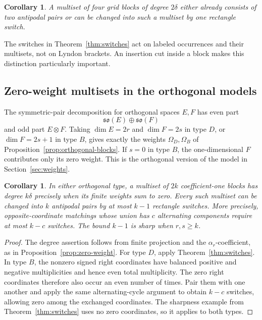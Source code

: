 \documentclass[11pt]{amsart}
\numberwithin{equation}{section}
\newtheorem{corollary}[theorem]{Corollary}
\theoremstyle{definition}
\begin{document}
\begin{corollary}\label{cor:four-weights}
A multiset of four grid blocks of degree $2\delta$ either already consists of two antipodal pairs or can be changed into such a multiset by one rectangle switch.
\end{corollary}

The switches in Theorem~\ref{thm:switches} act on labeled occurrences and their multisets, not on Lyndon brackets. An insertion cut inside a block makes this distinction particularly important.


\subsection{Zero-weight multisets in the orthogonal models}\label{subsec:orthogonal-switches}
The symmetric-pair decomposition for orthogonal spaces $E,F$ has even part
\[
 \mathfrak{so}(E)\oplus\mathfrak{so}(F)
\]
and odd part $E\otimes F$. Taking $\dim E=2r$ and $\dim F=2s$ in type $D$, or $\dim F=2s+1$ in type $B$, gives exactly the weights $\Omega_D,\Omega_B$ of Proposition~\ref{prop:orthogonal-blocks}. If $s=0$ in type $B$, the one-dimensional $F$ contributes only its zero weight. This is the orthogonal version of the model in Section~\ref{sec:weights}.

\begin{corollary}\label{cor:orthogonal-switches}
In either orthogonal type, a multiset of $2k$ coefficient-one blocks has degree $k\delta$ precisely when its finite weights sum to zero. Every such multiset can be changed into $k$ antipodal pairs by at most $k-1$ rectangle switches. More precisely, opposite-coordinate matchings whose union has $c$ alternating components require at most $k-c$ switches. The bound $k-1$ is sharp when $r,s\geq k$.
\end{corollary}
\begin{proof}
The degree assertion follows from finite projection and the $\alpha_r$-coefficient, as in Proposition~\ref{prop:zero-weight}. For type $D$, apply Theorem~\ref{thm:switches}. In type $B$, the nonzero signed right coordinates have balanced positive and negative multiplicities and hence even total multiplicity. The zero right coordinates therefore also occur an even number of times. Pair them with one another and apply the same alternating-cycle argument to obtain $k-c$ switches, allowing zero among the exchanged coordinates. The sharpness example from Theorem~\ref{thm:switches} uses no zero coordinates, so it applies to both types.
\end{proof}
\end{document}
